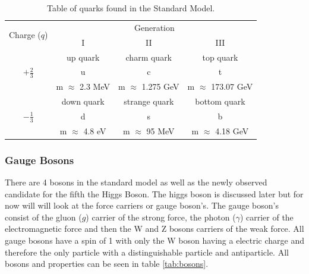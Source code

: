     \begin {table}[h]
        \begin{center}
        \begin{tabular}{|c|c|c|c|}
            \hline
            \multirow{2}{*}{Charge ($q$)}      & \multicolumn{3}{c|}{Generation} \\
            \cline{2-4}
                                & I     & II    & III   \\
            \hline
            \multirow{3}{*}{\Large $+\frac{2}{3}$} & up quark & charm quark & top quark \\
                                & {\Huge u}             & {\Huge c}             & {\Huge t} \\
                                & m $\approx$ 2.3 MeV   & m $\approx$ 1.275 GeV & m $\approx$ 173.07 GeV \\
            \hline
            \multirow{3}{*}{\Large $-\frac{1}{3}$}  & down quark & strange quark & bottom quark \\
                                & {\Huge d}             & {\Huge s}             & {\Huge b}     \\
                                & m $\approx$ 4.8 eV    & m $\approx$ 95 MeV    & m $\approx$ 4.18 GeV \\
            \hline
        \end{tabular}
        \caption{Table of quarks found in the Standard Model.}
        \label{tab:quarks}
        \end{center}
    \end {table}



    \subsubsection*{Gauge Bosons}
    There are 4 bosons in the standard model as well as the newly observed candidate for the fifth the Higgs Boson. The higgs boson is discussed later but for now will will look at the force carriers or gauge boson's. The gauge boson's consist of the gluon ($g$) carrier of the strong force, the photon ($\gamma$) carrier of the electromagnetic force and then the W and Z bosons carriers of the weak force. All gauge bosons have a spin of 1 with only the W boson having a electric charge and therefore the only particle with a distinguishable particle and antiparticle. All bosons and properties can be seen in table \ref{tab:bosons}.\\

